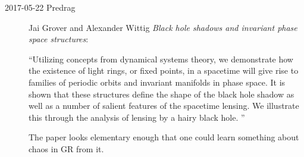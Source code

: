 \begin{description}
\item[2017-05-22 Predrag]
Jai Grover and Alexander Wittig
{\em Black hole shadows and invariant phase space structures}:

``Utilizing concepts from dynamical systems theory, we demonstrate how
the existence of light rings, or fixed points, in a spacetime will give
rise to families of periodic orbits and invariant manifolds in phase
space. It is shown that these structures define the shape of the black
hole shadow as well as a number of salient features of the spacetime
lensing. We illustrate this through the analysis of lensing by a hairy
black hole. ''

The paper looks elementary enough that one could learn something about
chaos in GR from it.


\end{description}

\printbibliography[heading=subbibintoc,title={References}]

